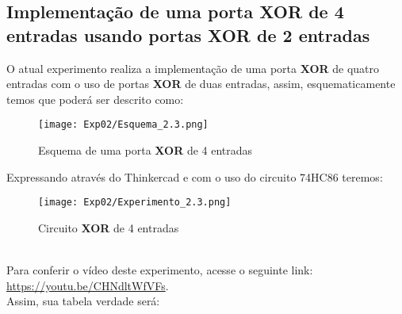\documentclass[12pt]{article}
\begin{document}
\subsection{Implementação de uma porta \textbf{XOR} de 4 entradas usando portas \textbf{XOR} de 2 entradas}
O atual experimento realiza a implementação de uma porta \textbf{XOR} de quatro entradas com o uso de portas \textbf{XOR} de duas entradas, assim, esquematicamente temos que poderá ser descrito como:

\begin{figure}[H]
    \centering
    \texttt{[image: Exp02/Esquema\_2.3.png]}
    \caption{Esquema de uma porta \textbf{XOR} de 4 entradas}\label{fig:Esquema_Experimento2_2.3}
\end{figure}

Expressando através do Thinkercad e com o uso do circuito 74HC86 teremos:

\begin{figure}[H]
    \centering
    \texttt{[image: Exp02/Experimento\_2.3.png]}
    \caption{Circuito \textbf{XOR} de 4 entradas}\label{fig:Esquema_Experimento2_2.3}
\end{figure}

\\
Para conferir o vídeo deste experimento, acesse o seguinte link:
\href{https://youtu.be/CHNdltWfVFs}{https://youtu.be/CHNdltWfVFs}.
\\
Assim, sua tabela verdade será:
\end{document}

